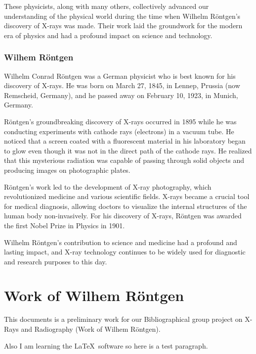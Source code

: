 \documentclass[a4paper,12pt]{report}
\begin{document}
These physicists, along with many others, collectively advanced our understanding of the physical world during the time when Wilhelm Röntgen's discovery of X-rays was made. Their work laid the groundwork for the modern era of physics and had a profound impact on science and technology.
\subsection{Wilhem Röntgen}
Wilhelm Conrad Röntgen was a German physicist who is best known for his discovery of X-rays. He was born on March 27, 1845, in Lennep, Prussia (now Remscheid, Germany), and he passed away on February 10, 1923, in Munich, Germany.

Röntgen's groundbreaking discovery of X-rays occurred in 1895 while he was conducting experiments with cathode rays (electrons) in a vacuum tube. He noticed that a screen coated with a fluorescent material in his laboratory began to glow even though it was not in the direct path of the cathode rays. He realized that this mysterious radiation was capable of passing through solid objects and producing images on photographic plates.

Röntgen's work led to the development of X-ray photography, which revolutionized medicine and various scientific fields. X-rays became a crucial tool for medical diagnosis, allowing doctors to visualize the internal structures of the human body non-invasively. For his discovery of X-rays, Röntgen was awarded the first Nobel Prize in Physics in 1901.

Wilhelm Röntgen's contribution to science and medicine had a profound and lasting impact, and X-ray technology continues to be widely used for diagnostic and research purposes to this day.
\chapter{Work of Wilhem Röntgen}


This documents is a preliminary work for our Bibliographical group project on X-Rays and Radiography (Work of Wilhem Röntgen). 

Also I am learning the \LaTeX\ software so here is a test paragraph.
\end{document}
